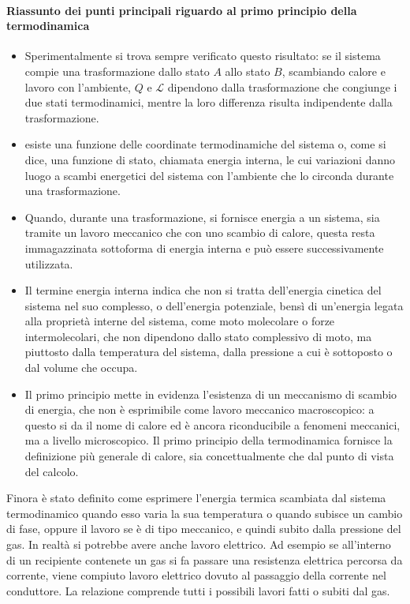 \documentclass[10pt,a4paper]{book}
\begin{document}
\paragraph{Riassunto dei punti principali riguardo al primo principio della termodinamica}
\begin{itemize}
	\item Sperimentalmente si trova sempre verificato questo risultato: se il sistema compie una trasformazione dallo stato $A$ allo stato $B$, scambiando calore e lavoro con l'ambiente, $Q$ e $\mathcal{L}$ dipendono dalla trasformazione che congiunge i due stati termodinamici, mentre la loro differenza risulta indipendente dalla trasformazione.
	\item esiste una funzione delle coordinate termodinamiche del sistema o, come si dice, una funzione di stato, chiamata energia interna, le cui variazioni danno luogo a scambi energetici del sistema con l'ambiente che lo circonda durante una trasformazione.
	\item Quando, durante una trasformazione, si fornisce energia a un sistema, sia tramite un lavoro meccanico che con uno scambio di calore, questa resta immagazzinata sottoforma di energia interna e può essere successivamente
	utilizzata.
	\item Il termine energia interna indica che non si tratta dell'energia cinetica del sistema nel suo complesso, o dell'energia potenziale, bensì di un'energia legata alla proprietà interne del sistema, come moto molecolare o forze intermolecolari, che non dipendono dallo stato complessivo di moto, ma piuttosto dalla temperatura del sistema, dalla pressione a cui è sottoposto o dal volume che occupa.
	\item Il primo principio mette in evidenza l'esistenza di un meccanismo di scambio di energia, che non è esprimibile come lavoro meccanico macroscopico: a questo si da il nome di calore ed è ancora riconducibile a fenomeni meccanici, ma a livello microscopico. Il primo principio della termodinamica fornisce la definizione più generale di calore, sia concettualmente che dal punto di vista del calcolo.
\end{itemize}
Finora è stato definito come esprimere l'energia termica scambiata dal sistema termodinamico quando esso varia la sua temperatura o quando subisce un cambio di fase, oppure il lavoro se è di tipo meccanico, e quindi subito dalla pressione del gas. In realtà si potrebbe avere anche lavoro elettrico. Ad esempio se all'interno di un recipiente contenete un gas si fa passare una resistenza elettrica percorsa da corrente, viene compiuto lavoro elettrico dovuto al passaggio della corrente nel conduttore. La relazione comprende tutti i possibili lavori fatti o subiti dal gas.
\end{document}

